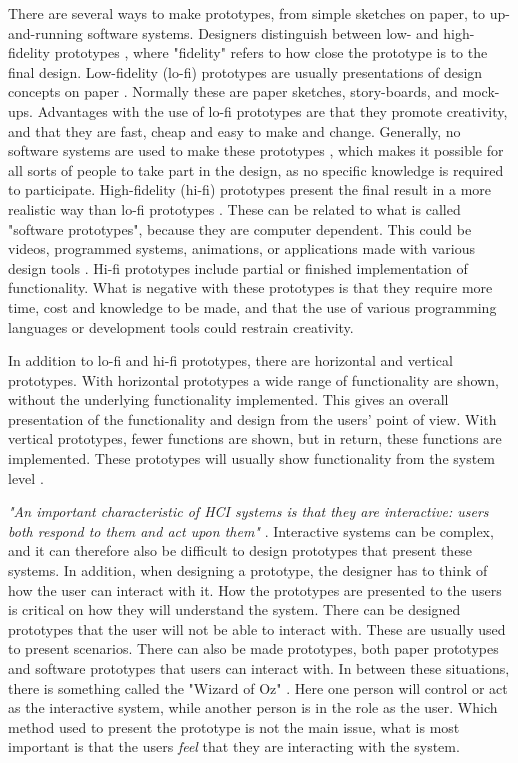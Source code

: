 There are several ways to make prototypes, from simple sketches on paper, to up-and-running software systems. Designers distinguish between low- and high-fidelity prototypes \cite{mackayprototyping} \cite{houde1997prototypes} \cite{mmi}, where "fidelity" refers to how close the prototype is to the final design. Low-fidelity (lo-fi) prototypes are usually presentations of design concepts on paper \cite{mmi} \cite{lofihifi}. Normally these are paper sketches, story-boards, and mock-ups. Advantages with the use of lo-fi prototypes are that they promote creativity, and that they are fast, cheap and easy to make and change. Generally, no software systems are used to make these prototypes \cite{lofihifi}, which makes it possible for all sorts of people to take part in the design, as no specific knowledge is required to participate. High-fidelity (hi-fi) prototypes present the final result in a more realistic way than lo-fi prototypes \cite{mmi}. These can be related to what is called "software prototypes", because they are computer dependent. This could be videos, programmed systems, animations, or applications made with various design tools \cite{mackayprototyping}. Hi-fi prototypes include partial or finished implementation of functionality. What is negative with these prototypes is that they require more time, cost and knowledge to be made, and that the use of various programming languages or development tools could restrain creativity. 

In addition to lo-fi and hi-fi prototypes, there are horizontal and vertical prototypes. With horizontal prototypes a wide range of functionality are shown, without the underlying functionality implemented. This gives an overall presentation of the functionality and design from the users' point of view. With vertical prototypes, fewer functions are shown, but in return, these functions are implemented. These prototypes will usually show functionality from the system level \cite{mackayprototyping} \cite{horver}.

\emph{"An important characteristic of HCI systems is that they are interactive: users both respond to them and act upon them"} \cite{mackayprototyping}. Interactive systems can be complex, and it can therefore also be difficult to design prototypes that present these systems. In addition, when designing a prototype, the designer has to think of how the user can interact with it. How the prototypes are presented to the users is critical on how they will understand the system. There can be designed prototypes that the user will not be able to interact with. These are usually used to present scenarios. There can also be made prototypes, both paper prototypes and software prototypes that users can interact with. In between these situations, there is something called the "Wizard of Oz" \cite{mackayprototyping}. Here one person will control or act as the interactive system, while another person is in the role as the user. Which method used to present the prototype is not the main issue, what is most important is that the users \emph{feel} that they are interacting with the system.

